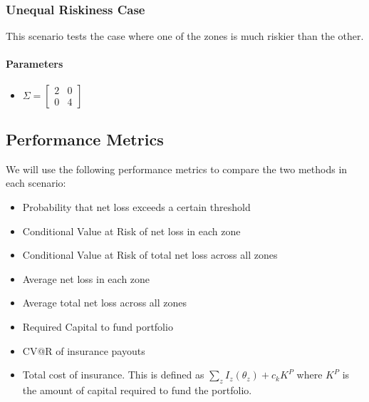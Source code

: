 \documentclass[11pt]{article}
\begin{document}
    \subsubsection*{Unequal Riskiness Case}
    This scenario tests the case where one of the zones is much riskier than the other. 
    \paragraph*{Parameters}
    \begin{itemize}
        \item $\Sigma = \begin{bmatrix}
            2 & 0 \\
            0 & 4 
            \end{bmatrix} $
    \end{itemize}

  \subsection{Performance Metrics}
    We will use the following performance metrics to compare the two methods in each scenario: 
    \begin{itemize}
        \item Probability that net loss exceeds a certain threshold 
        \item Conditional Value at Risk of net loss in each zone 
        \item Conditional Value at Risk of total net loss across all zones 
        \item Average net loss in each zone 
        \item Average total net loss across all zones 
        \item Required Capital to fund portfolio 
        \item CV@R of insurance payouts
        \item Total cost of insurance. This is defined as $\sum_z I_z(\theta_z)+ c_k K^P$ where $K^P$ is the amount of capital required to fund the portfolio. 
    \end{itemize}
\end{document}
